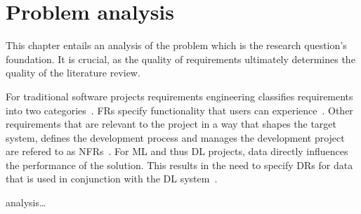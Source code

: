 \chapter{Problem analysis}\label{ch:problem}
This chapter entails an analysis of the problem which is the research question's foundation.
It is crucial, as the quality of requirements ultimately determines the quality of the literature review.

For traditional software projects requirements engineering classifies requirements into
two categories~\cite{zowghi_requirements_2014}.
\Acp{FR} specify functionality that users can experience~\cite{noauthor_ieee_1998}.
Other requirements that are relevant to the project in a way that shapes the target system,
defines the development process and manages the development project are refered to as
\acp{NFR}~\cite{kotonya_requirements_1998,chung_non-functional_2009}.
For \ac{ML} and thus \ac{DL} projects, data directly influences the performance of the solution.
This results in the need to specify \acp{DR} for data that is used
in conjunction with the \ac{DL} system~\cite{vogelsang_requirements_2019}.

analysis\ldots


